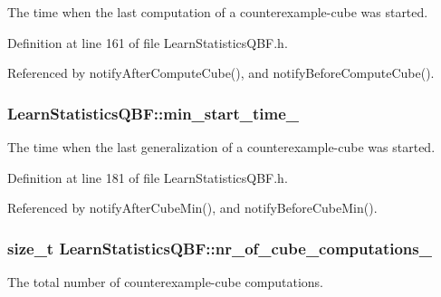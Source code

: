 The time when the last computation of a counterexample-\/cube was started. 



Definition at line 161 of file Learn\-Statistics\-Q\-B\-F.\-h.



Referenced by notify\-After\-Compute\-Cube(), and notify\-Before\-Compute\-Cube().

\hypertarget{classLearnStatisticsQBF_a929ae751d1bbb728f96132e5ee6d99fa}{
\subsubsection[{min\-\_\-start\-\_\-time\-\_\-}]{ Learn\-Statistics\-Q\-B\-F\-::min\-\_\-start\-\_\-time\-\_\-\hspace{0.3cm}{\ttfamily [protected]}}}\label{classLearnStatisticsQBF_a929ae751d1bbb728f96132e5ee6d99fa}


The time when the last generalization of a counterexample-\/cube was started. 



Definition at line 181 of file Learn\-Statistics\-Q\-B\-F.\-h.



Referenced by notify\-After\-Cube\-Min(), and notify\-Before\-Cube\-Min().

\hypertarget{classLearnStatisticsQBF_a857dac1670c551b3dcf935860651143b}{
\subsubsection[{nr\-\_\-of\-\_\-cube\-\_\-computations\-\_\-}]{\setlength{\rightskip}{0pt plus 5cm}size\-\_\-t Learn\-Statistics\-Q\-B\-F\-::nr\-\_\-of\-\_\-cube\-\_\-computations\-\_\-\hspace{0.3cm}{\ttfamily [protected]}}}\label{classLearnStatisticsQBF_a857dac1670c551b3dcf935860651143b}


The total number of counterexample-\/cube computations. 



